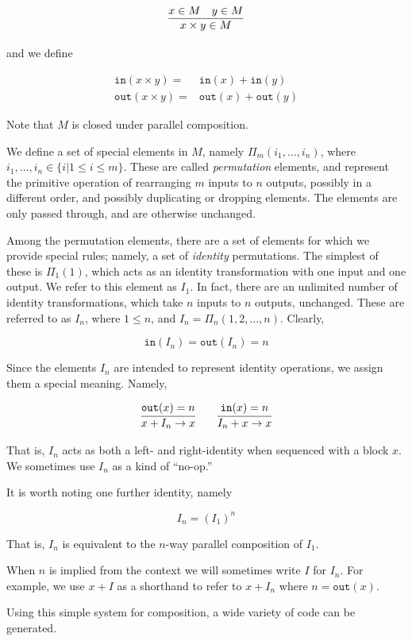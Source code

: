 \[
\infer
  {x \times y \in M}
  {x \in M \quad y \in M}
\]

and we define

\begin{eqnarray*}
\mathtt{in} (x \times y) =& \mathtt{in}(x)  + \mathtt{in}(y)\\ 
\mathtt{out}(x
\times y) =& \mathtt{out}(x) + \mathtt{out}(y) \end{eqnarray*}

Note that $M$ is closed under parallel composition.

We define a set of special elements in $M$, namely $\Pi_m(i_1,\ldots,i_n)$, where $i_1,\ldots,i_n \in \lbrace i | 1 \leq i \leq m \rbrace$. These are called \emph{permutation} elements, and represent the primitive operation of rearranging $m$ inputs to $n$ outputs, possibly in a different order, and possibly duplicating or dropping elements. The elements are only passed through, and are otherwise unchanged.

Among the permutation elements, there are a set of elements for which we provide special rules; namely, a set of \emph{identity} permutations. The simplest of these is $\Pi_1(1)$, which acts as an identity transformation with one input and one output. We refer to this element as $I_1$. In fact, there are an unlimited number of identity transformations, which take $n$ inputs to $n$ outputs, unchanged. These are referred to as $I_n$, where $1 \leq n$, and $I_n = \Pi_n(1,2,\ldots,n)$. Clearly,

\[
\mathtt{in}(I_n) = \mathtt{out}(I_n) = n
\]

Since the elements $I_n$ are intended to represent identity operations, we assign them a special meaning. Namely,

\[
\infer{x + I_n \to x}{\mathtt{out}(x) = n} 
\qquad
\infer{I_n + x \to x}{\mathtt{in}(x) = n}
\]

That is, $I_n$ acts as both a left- and right-identity when sequenced with a block $x$. We sometimes use $I_n$ as a kind of ``no-op.''

It is worth noting one further identity, namely

\[
I_n = (I_1)^n
\]

That is, $I_n$ is equivalent to the $n$-way parallel composition of $I_1$.

When $n$ is implied from the context we will sometimes write $I$ for $I_n$. For example, we use $x+I$ as a shorthand to refer to $x+I_n$ where $n = \mathtt{out}(x)$.

Using this simple system for composition, a wide variety of code can be generated.
